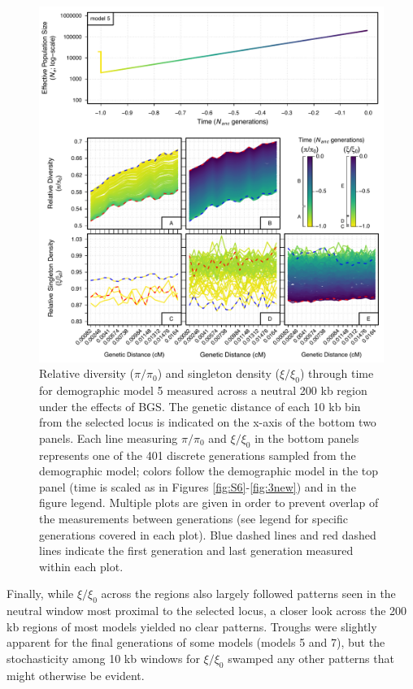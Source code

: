 \documentclass[9pt,twocolumn,twoside]{rilabRxiv}
\begin{document}
\begin{figure}[]
\includegraphics[width=\linewidth]{figures/FigS13.pdf}
\caption{Relative diversity ($\pi/\pi_0$) and singleton density ($\xi/\xi_0$) through time for demographic model 5 measured across a neutral 200 kb region under the effects of BGS. The genetic distance of each 10 kb bin from the selected locus is indicated on the x-axis of the bottom two panels. Each line measuring $\pi/\pi_0$ and $\xi/\xi_0$ in the bottom panels represents one of the 401 discrete generations sampled from the demographic model; colors follow the demographic model in the top panel (time is scaled as in Figures \ref{fig:S6}-\ref{fig:3new}) and in the figure legend. Multiple plots are given in order to prevent overlap of the measurements between generations (see legend for specific generations covered in each plot). Blue dashed lines and red dashed lines indicate the first generation and last generation measured within each plot.}
\label{fig:200kb}
\end{figure}

Finally, while  $\xi/\xi_0$ across the regions also largely followed patterns seen in the neutral window most proximal to the selected locus, a closer look across the 200 kb regions of most models yielded no clear patterns. 
Troughs were slightly apparent for the final generations of some models (models 5 and 7), but the stochasticity among 10 kb windows for $\xi/\xi_0$ swamped any other patterns that might otherwise be evident.
\end{document}

